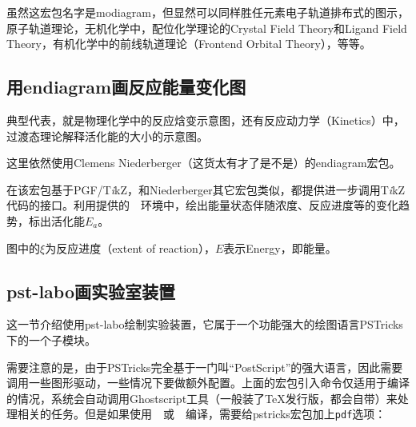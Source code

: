 \documentclass[a4paper,UTF8,zihao = -4]{ctexart} %
\providecommand{\tikzlg}{PGF/T\textit{i}kZ}
\newcommand{\tkznm}{T\textit{i}kZ}
\begin{document}
虽然这宏包名字是\textsf{modiagram}，但显然可以同样胜任元素电子轨道排布式的图示，原子轨道理论，无机化学中，配位化学理论的Crystal Field Theory和Ligand Field Theory，有机化学中的前线轨道理论（Frontend Orbital Theory），等等。

\subsection{用\textsf{endiagram}画反应能量变化图}
\label{sec:energylevel}

典型代表，就是物理化学中的反应焓变示意图，还有反应动力学（Kinetics）中，过渡态理论解释活化能的大小的示意图。

这里依然使用Clemens Niederberger（这货太有才了是不是）的\textsf{endiagram}宏包。

\begin{dispListing}
\usepackage{endiagram} %
\end{dispListing}

在该宏包基于\tikzlg{}，和Niederberger其它宏包类似，都提供进一步调用\tkznm{}代码的接口。利用提供的~~环境中，绘出能量状态伴随浓度、反应进度等的变化趋势，标出活化能$E_a$。

\begin{dispExample}
\begin{endiagram}
  \ShowEa[label,label-pos=.3]
\end{endiagram}
\end{dispExample}

图中的$\xi$为反应进度（extent of reaction），$E$表示Energy，即能量。

\subsection{\textsf{pst-labo}画实验室装置}
\label{sec:pst-labo}

这一节介绍使用\textsf{pst-labo}绘制实验装置，它属于一个功能强大的绘图语言PSTricks下的一个子模块。

\begin{dispListing}
\usepackage{pstricks} %
\usepackage{pst-labo} %
\end{dispListing}

需要注意的是，由于PSTricks完全基于一门叫“PostScript”的强大语言，因此需要调用一些图形驱动，一些情况下要做额外配置。上面的宏包引入命令仅适用于编译的情况，系统会自动调用Ghostscript工具（一般装了\TeX{}发行版，都会自带）来处理相关的任务。但是如果使用~~或~~编译，需要给\textsf{pstricks}宏包加上\texttt{pdf}选项：
\end{document}
